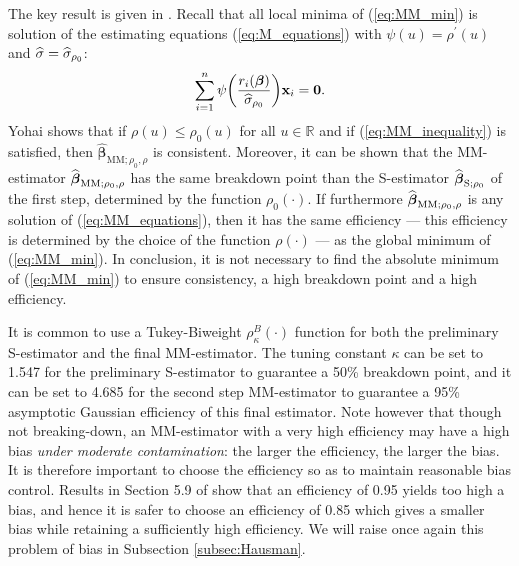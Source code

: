 \begin{stremark}
The key result is given in \citet{yohai:1987}. Recall that all local minima
of (\ref{eq:MM_min}) is solution of the estimating equations
(\ref{eq:M_equations}) with $\psi\left(  u\right)  =\rho^{\prime}\left(
u\right)  $ and $\widehat{\sigma}=\widehat{\sigma}_{\rho_{0}}$:
\begin{equation}
\sum_{i=1}^{n}\psi\left(  \frac{r_{i}\left(  \boldsymbol\beta\right)
}{\sthat{\sigma}_{\rho_{0}}}\right)  \stvec{x}_{i}=\mathbf{0}.
\label{eq:MM_equations}%
\end{equation}
Yohai shows that if $\rho\left(  u\right)  \leq\rho_{0}\left(  u\right)  $ for
all $u\in%
\mathbb{R}
$ and if (\ref{eq:MM_inequality}) is satisfied, then $\widehat
{\boldsymbol\beta}_{\mathrm{MM};\rho_{0},\rho}$ is consistent. Moreover, it
can be shown that the MM-estimator $\sthat{\boldsymbol\beta}%
_{\mathrm{MM};\rho_{0},\rho}$ has the same breakdown point than the
S-estimator $\widehat{\boldsymbol\beta}_{\mathrm{S};\rho_{0}}$ of the first
step, determined by the function $\rho_{0}\left(  \cdot\right)  $. If
furthermore $\widehat{\boldsymbol\beta}_{\mathrm{MM};\rho_{0},\rho}$ is any
solution of (\ref{eq:MM_equations}), then it has the same efficiency --- this
efficiency is determined by the choice of the function $\rho\left(
\cdot\right)  $ --- as the global minimum of (\ref{eq:MM_min}). In conclusion,
it is not necessary to find the absolute minimum of (\ref{eq:MM_min}) to
ensure consistency, a high breakdown point and a high efficiency.
\end{stremark}

It is common to use a Tukey-Biweight $\rho_{\kappa}^{B}\left(  \cdot\right)  $
function for both the preliminary S-estimator and the final MM-estimator. The
tuning constant $\kappa$ can be set to 1.547 for the preliminary S-estimator
to guarantee a 50\% breakdown point, and it can be set to 4.685 for the second
step MM-estimator to guarantee a 95\% asymptotic Gaussian efficiency of this
final estimator. Note however that though not breaking-down, an MM-estimator
with a very high efficiency may have a high bias \emph{under moderate
contamination}: the larger the efficiency, the larger the bias. It is
therefore important to choose the efficiency so as to maintain reasonable bias
control. Results in Section 5.9 of \citet{maronna:etal:2006} show
that an efficiency of 0.95 yields too high a bias, and hence it is safer to
choose an efficiency of 0.85 which gives a smaller bias while retaining a
sufficiently high efficiency. We will raise once again this problem of bias in
Subsection \ref{subsec:Hausman}.

